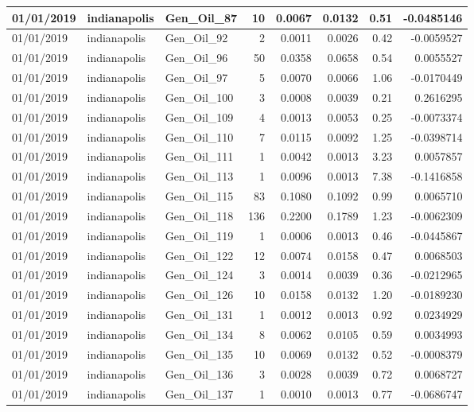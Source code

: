 \documentclass[
  letterpaper,
  DIV=11,
  numbers=noendperiod]{scrartcl}
\begin{document}
\begin{tabular}{l|l|l|r|r|r|r|r}
\hline
01/01/2019 & indianapolis & Gen\_Oil\_87 & 10 & 0.0067 & 0.0132 & 0.51 & -0.0485146\\
\hline
01/01/2019 & indianapolis & Gen\_Oil\_92 & 2 & 0.0011 & 0.0026 & 0.42 & -0.0059527\\
\hline
01/01/2019 & indianapolis & Gen\_Oil\_96 & 50 & 0.0358 & 0.0658 & 0.54 & 0.0055527\\
\hline
01/01/2019 & indianapolis & Gen\_Oil\_97 & 5 & 0.0070 & 0.0066 & 1.06 & -0.0170449\\
\hline
01/01/2019 & indianapolis & Gen\_Oil\_100 & 3 & 0.0008 & 0.0039 & 0.21 & 0.2616295\\
\hline
01/01/2019 & indianapolis & Gen\_Oil\_109 & 4 & 0.0013 & 0.0053 & 0.25 & -0.0073374\\
\hline
01/01/2019 & indianapolis & Gen\_Oil\_110 & 7 & 0.0115 & 0.0092 & 1.25 & -0.0398714\\
\hline
01/01/2019 & indianapolis & Gen\_Oil\_111 & 1 & 0.0042 & 0.0013 & 3.23 & 0.0057857\\
\hline
01/01/2019 & indianapolis & Gen\_Oil\_113 & 1 & 0.0096 & 0.0013 & 7.38 & -0.1416858\\
\hline
01/01/2019 & indianapolis & Gen\_Oil\_115 & 83 & 0.1080 & 0.1092 & 0.99 & 0.0065710\\
\hline
01/01/2019 & indianapolis & Gen\_Oil\_118 & 136 & 0.2200 & 0.1789 & 1.23 & -0.0062309\\
\hline
01/01/2019 & indianapolis & Gen\_Oil\_119 & 1 & 0.0006 & 0.0013 & 0.46 & -0.0445867\\
\hline
01/01/2019 & indianapolis & Gen\_Oil\_122 & 12 & 0.0074 & 0.0158 & 0.47 & 0.0068503\\
\hline
01/01/2019 & indianapolis & Gen\_Oil\_124 & 3 & 0.0014 & 0.0039 & 0.36 & -0.0212965\\
\hline
01/01/2019 & indianapolis & Gen\_Oil\_126 & 10 & 0.0158 & 0.0132 & 1.20 & -0.0189230\\
\hline
01/01/2019 & indianapolis & Gen\_Oil\_131 & 1 & 0.0012 & 0.0013 & 0.92 & 0.0234929\\
\hline
01/01/2019 & indianapolis & Gen\_Oil\_134 & 8 & 0.0062 & 0.0105 & 0.59 & 0.0034993\\
\hline
01/01/2019 & indianapolis & Gen\_Oil\_135 & 10 & 0.0069 & 0.0132 & 0.52 & -0.0008379\\
\hline
01/01/2019 & indianapolis & Gen\_Oil\_136 & 3 & 0.0028 & 0.0039 & 0.72 & 0.0068727\\
\hline
01/01/2019 & indianapolis & Gen\_Oil\_137 & 1 & 0.0010 & 0.0013 & 0.77 & -0.0686747\\

\end{tabular}
\end{document}
